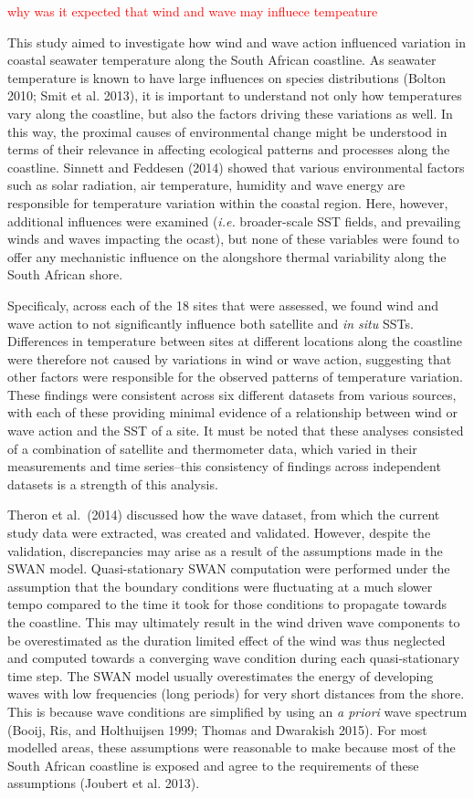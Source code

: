 \documentclass[12pt,a4paper,]{article}
\begin{document}
\textcolor{red}{why was it expected that wind and wave may influece tempeature}

This study aimed to investigate how wind and wave action influenced
variation in coastal seawater temperature along the South African
coastline. As seawater temperature is known to have large influences on
species distributions (Bolton 2010; Smit et al. 2013), it is important
to understand not only how temperatures vary along the coastline, but
also the factors driving these variations as well. In this way, the
proximal causes of environmental change might be understood in terms of
their relevance in affecting ecological patterns and processes along the
coastline. Sinnett and Feddesen (2014) showed that various environmental
factors such as solar radiation, air temperature, humidity and wave
energy are responsible for temperature variation within the coastal
region. Here, however, additional influences were examined (\emph{i.e.}
broader-scale SST fields, and prevailing winds and waves impacting the
ocast), but none of these variables were found to offer any mechanistic
influence on the alongshore thermal variability along the South African
shore.

Specificaly, across each of the 18 sites that were assessed, we found
wind and wave action to not significantly influence both satellite and
\emph{in situ} SSTs. Differences in temperature between sites at
different locations along the coastline were therefore not caused by
variations in wind or wave action, suggesting that other factors were
responsible for the observed patterns of temperature variation. These
findings were consistent across six different datasets from various
sources, with each of these providing minimal evidence of a relationship
between wind or wave action and the SST of a site. It must be noted that
these analyses consisted of a combination of satellite and thermometer
data, which varied in their measurements and time series--this
consistency of findings across independent datasets is a strength of
this analysis.

Theron et al.~(2014) discussed how the wave dataset, from which the
current study data were extracted, was created and validated. However,
despite the validation, discrepancies may arise as a result of the
assumptions made in the SWAN model. Quasi-stationary SWAN computation
were performed under the assumption that the boundary conditions were
fluctuating at a much slower tempo compared to the time it took for
those conditions to propagate towards the coastline. This may ultimately
result in the wind driven wave components to be overestimated as the
duration limited effect of the wind was thus neglected and computed
towards a converging wave condition during each quasi-stationary time
step. The SWAN model usually overestimates the energy of developing
waves with low frequencies (long periods) for very short distances from
the shore. This is because wave conditions are simplified by using an
\emph{a priori} wave spectrum (Booij, Ris, and Holthuijsen 1999; Thomas
and Dwarakish 2015). For most modelled areas, these assumptions were
reasonable to make because most of the South African coastline is
exposed and agree to the requirements of these assumptions (Joubert et
al. 2013).
\end{document}
